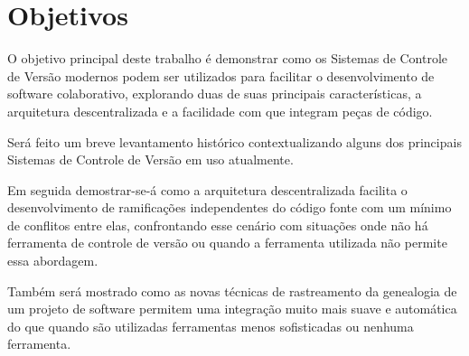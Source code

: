 \section{Objetivos}

O objetivo principal deste trabalho é demonstrar como os Sistemas de Controle de Versão
modernos podem ser utilizados para facilitar o desenvolvimento de software colaborativo,
explorando duas de suas principais características, a arquitetura descentralizada e a facilidade com
que integram peças de código.

Será feito um breve levantamento histórico contextualizando alguns dos principais Sistemas de
Controle de Versão em uso atualmente.

Em seguida demostrar-se-á como a arquitetura descentralizada facilita o desenvolvimento de
ramificações independentes do código fonte com um mínimo de conflitos entre elas, confrontando
esse cenário com situações onde não há ferramenta de controle de versão ou quando a ferramenta
utilizada não permite essa abordagem.

Também será mostrado como as novas técnicas de rastreamento da genealogia de um projeto de
software permitem uma integração muito mais suave e automática do que quando são utilizadas
ferramentas menos sofisticadas ou nenhuma ferramenta.